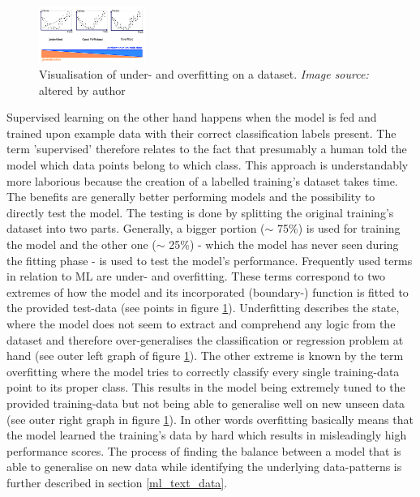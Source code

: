 \begin{figure}
   \centering
   \includegraphics[width=0.31\textwidth]{img/over_underfitting}
   \caption{Visualisation of under- and overfitting on a dataset. \textit{Image source:} \parencite{Bhande2018} altered by author}
   \label{fig:over_underfitting}
\end{figure}

Supervised learning on the other hand happens when the model is fed and trained upon example data with their correct classification labels present. The term 'supervised' therefore relates to the fact that presumably a human told the model which data points belong to which class. This approach is understandably more laborious because the creation of a labelled training's dataset takes time. The benefits are generally better performing models and the possibility to directly test the model. The testing is done by splitting the original training's dataset into two parts. Generally, a bigger portion ($\sim$ 75\%) is used for training the model and the other one ($\sim$ 25\%) - which the model has never seen during the fitting phase - is used to test the model's performance.
Frequently used terms in relation to ML are under- and overfitting. These terms correspond to two extremes of how the model and its incorporated (boundary-) function is fitted to the provided test-data (see points in figure \ref{fig:over_underfitting}). Underfitting describes the state, where the model does not seem to extract and comprehend any logic from the dataset and therefore over-generalises the classification or regression problem at hand (see outer left graph of figure \ref{fig:over_underfitting}). The other extreme is known by the term overfitting where the model tries to correctly classify every single training-data point to its proper class. This results in the model being extremely tuned to the provided training-data but not being able to generalise well on new unseen data (see outer right graph in figure \ref{fig:over_underfitting}). In other words overfitting basically means that the model learned the training's data by hard which results in misleadingly high performance scores.
The process of finding the balance between a model that is able to generalise on new data while identifying the underlying data-patterns is further described in section \ref{ml_text_data}.

